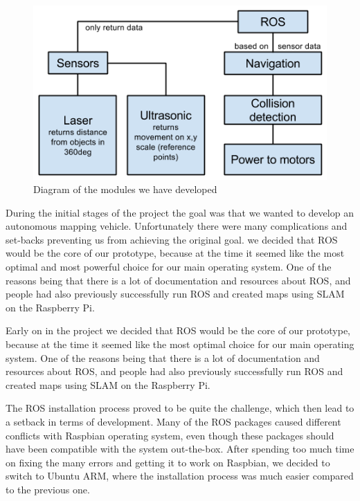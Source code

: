 \begin{figure}[H]
	\centering
	\includegraphics[scale=.7]{images/developmentdiagram2.png}
	\caption{Diagram of the modules we have developed}
	\label{fig:developmentdiagram2}
\end{figure}

During the initial stages of the project the goal was that we wanted to develop an autonomous mapping vehicle. Unfortunately there were many complications and set-backs preventing us from achieving the original goal. 
 we decided that ROS would be the core of our prototype, because at the time it seemed like the most optimal and most powerful choice for our main operating system. One of the reasons being that there is a lot of documentation and resources about ROS, and people had also previously successfully run ROS and created maps using SLAM on the Raspberry Pi.\cite{pibot}\cite{pibotbook}

Early on in the project we decided that ROS would be the core of our prototype, because at the time it seemed like the most optimal choice for our main operating system. One of the reasons being that there is a lot of documentation and resources about ROS, and people had also previously successfully run ROS and created maps using SLAM on the Raspberry Pi.

The ROS installation process proved to be quite the challenge, which then lead to a setback in terms of development. Many of the ROS packages caused different conflicts with Raspbian operating system, even though these packages should have been compatible with the system out-the-box. After spending too much time on fixing the many errors and getting it to work on Raspbian, we decided to switch to Ubuntu ARM, where the installation process was much easier compared to the previous one.


